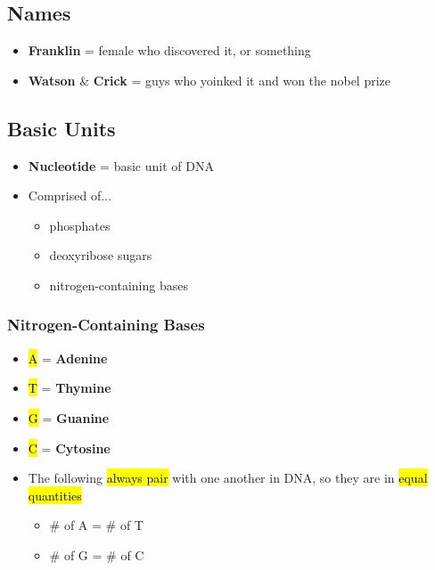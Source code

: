 \documentclass[a4paper,12pt]{article}
\begin{document}
\subsection{Names}
\begin{itemize}
    \item{\textbf{Franklin} = female who discovered it, or something}
    \item{\textbf{Watson} \& \textbf{Crick} = guys who yoinked it and won the nobel prize}
\end{itemize}

\subsection{Basic Units}
\begin{itemize}
    \item{\textbf{Nucleotide} = basic unit of DNA}
    \item{
            Comprised of...
            \begin{itemize}
                \item{phosphates}
                \item{deoxyribose sugars}
                \item{nitrogen-containing bases}
            \end{itemize}
        }
\end{itemize}

\subsubsection{Nitrogen-Containing Bases}
\begin{itemize}
    \item{\hl{A} = \textbf{Adenine}}
    \item{\hl{T} = \textbf{Thymine}}
    \item{\hl{G} = \textbf{Guanine}}
    \item{\hl{C} = \textbf{Cytosine}}
        \\
    \item{
            The following \hl{always pair} with one another in DNA, so they are in \hl{equal quantities}
            \begin{itemize}
                \item{\# of A = \# of T}
                \item{\# of G = \# of C}
            \end{itemize}
        }
\end{itemize}
\end{document}
